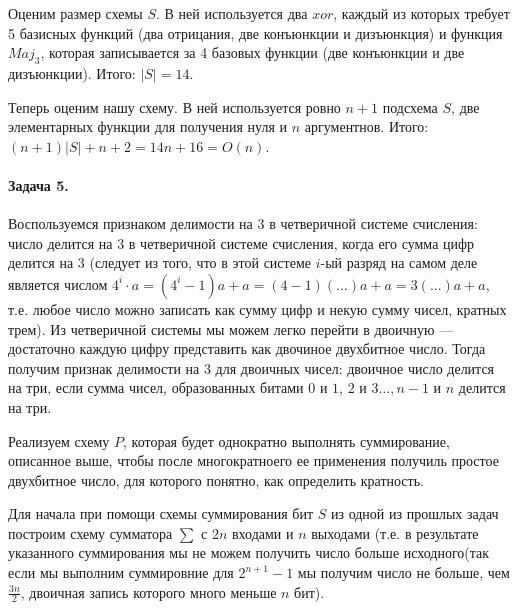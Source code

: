\documentclass{article}
\newcommand{\andi}{$ и $}
\newcommand{\half}[1]{\frac{#1}{2}}
\begin{document}
    Оценим размер схемы $S$. В ней используется два $xor$, каждый из которых требует 5 базисных функций (два отрицания, две конъюнкции и дизъюнкция) и функция $Maj_3$, которая записывается за 4 базовых функции (две конъюнкции и две дизъюнкции). Итого: $|S| = 14$.

    Теперь оценим нашу схему. В ней используется ровно $n + 1$ подсхема $S$, две элементарных функции для получения нуля и $n$ аргументнов. Итого: $(n + 1) |S| + n + 2 =14n + 16= O(n)$.

    \paragraph{Задача 5.}
    Воспользуемся признаком делимости на 3 в четверичной системе счисления: число делится на 3 в четверичной системе счисления, когда его сумма цифр делится на 3 (следует из того, что в этой системе $i$-ый разряд на самом деле является числом $4^i \cdot a = (4^i - 1)a + a = (4 - 1)(\ldots)a + a = 3(...)a + a$, т.е. любое число можно записать как сумму цифр и некую сумму чисел, кратных трем). Из четверичной системы мы можем легко перейти в двоичную --- достаточно каждую цифру представить как двочиное двухбитное число. Тогда получим признак делимости на 3 для двоичных чисел: двоичное число делится на три, если сумма чисел, образованных битами $0$ и $1$, $2 \andi 3 \ldots, n - 1\andi n$ делится на три.

    Реализуем схему $P$, которая будет однократно выполнять суммирование, описанное выше, чтобы после многократноего ее применения получиль простое двухбитное число, для которого понятно, как определить кратность.

    Для начала при помощи схемы суммирования бит $S$ из одной из прошлых задач построим схему сумматора $\sum$ с $2n$ входами и $n$ выходами (т.е. в результате указанного суммирования мы не можем получить число больше исходного(так если мы выполним суммировние для $2^{n + 1} - 1$ мы получим число не больше, чем $\half{3n}$, двоичная запись которого много меньше $n$ бит).
\end{document}

